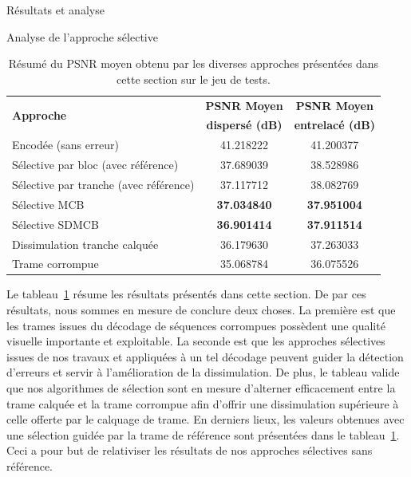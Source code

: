 \begin{chapter}{Résultats et analyse}
\begin{section}{Analyse de l'approche sélective}
\begin{table}[!htb]
\caption[Résumé du PSNR moyen obtenu par les diverses approches
présentées]{Résumé du PSNR moyen obtenu par les diverses approches présentées dans cette section sur le jeu de tests.}
\label{tab-ResumeSelectif}
\small
\centering
\begin{tabular}{| l | c | c |}
 \hline
 \multirow{2}{*}{\textbf{Approche}} & \textbf{PSNR Moyen}& \textbf{PSNR Moyen}\\
 &\textbf{dispersé (dB)}&\textbf{entrelacé (dB)}\\
 \hline
 Encodée (sans erreur) & 41.218222 & 41.200377\\
  \hline
 Sélective par bloc (avec référence) & 37.689039 & 38.528986\\
  \hline
 Sélective par tranche (avec référence) & 37.117712 & 38.082769\\
  \hline
 Sélective MCB & \textbf{37.034840} & \textbf{37.951004}\\
  \hline
 Sélective SDMCB & \textbf{36.901414} & \textbf{37.911514}\\
  \hline
 Dissimulation tranche calquée & 36.179630 & 37.263033\\
  \hline
 Trame corrompue & 35.068784 & 36.075526\\
 \hline   
\end{tabular}
\end{table}

Le tableau~\ref{tab-ResumeSelectif} résume les résultats présentés dans cette
section. De par ces résultats, nous sommes en mesure de conclure deux choses. La
première est que les trames issues du décodage de séquences corrompues possèdent
une qualité visuelle importante et exploitable. La seconde est que les approches
sélectives issues de nos travaux et appliquées à un tel décodage peuvent guider
la détection d'erreurs et servir à l'amélioration de la dissimulation. De plus,
le tableau valide que nos algorithmes de sélection sont en mesure d’alterner
efficacement entre la trame calquée et la trame corrompue afin d’offrir une
dissimulation supérieure à celle offerte par le calquage de trame. En derniers
lieux, les valeurs obtenues avec une sélection guidée par la trame de référence
sont présentées dans le tableau~\ref{tab-ResumeSelectif}. Ceci a pour but
de relativiser les résultats de nos approches sélectives sans référence.
\end{section}

\end{chapter}